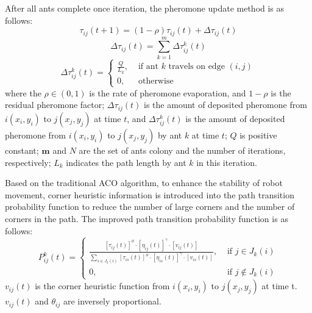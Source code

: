 \documentclass{iosart2c}
\begin{document}
After all ants complete once iteration, the pheromone update method is as follows:
\begin{equation} %
\tau_{i j}(t+1)=(1-\rho) \tau_{i j}(t)+\Delta \tau_{i j}(t)
\label{eq5}
\end{equation}
\begin{equation} %
\Delta \tau_{i j}(t)=\sum_{k=1}^{m} \Delta \tau_{i j}^{k}(t)
\end{equation}
\begin{equation} %
\Delta \tau_{i j}^{k}(t)=\left\{\begin{array}{ll}{\frac{Q}{L_{k}},} & {\text { if ant } k \text { travels on edge }(i, j)} \\ {0,} & {\text { otherwise }}\end{array}\right.
\end{equation}
where the $\rho \in(0,1)$ is the rate of pheromone evaporation, and $1-\rho$ is the residual
pheromone factor; $\Delta \tau_{i j}(t)$ is the amount of deposited pheromone from $i\left(x_{i}, y_{i}\right)$ to $j\left(x_{j}, y_{j}\right)$ at time $t$, and $\Delta \tau_{i j}^{k}(t)$ is the amount of deposited pheromone from $i\left(x_{i}, y_{i}\right)$ to $j\left(x_{j}, y_{j}\right)$ by ant $k$ at time $t$; $Q$ is positive constant; $\mathbf{m}$ and $N$ are the set of ants colony and the number of iterations, respectively; $L_{k}$ indicates the path length by ant $k$ in this iteration.

Based on the traditional ACO algorithm, to enhance the stability of robot movement, corner heuristic information is introduced into the path transition probability function to reduce the number of large corners and the number of corners in the path. The improved path transition probability function is as follows:
\begin{equation} %
\!P_{i j}^{k}(t)\!\!=\left\{\!\begin{array}{ll}
\frac{\!\left[\tau_{i j}(t)\right]^{\phi}\! \cdot \!\left[\eta_{i j}(t)\right]^{\gamma}\! \cdot \!\left[v_{i j}(t)\right]\!}{\sum\limits_{s \in \!J_{k}(i)\!} \!\left[\tau_{i s}(t)\right]^{\phi}\! \cdot \!\left[\eta_{i s}(t)\right]^{\gamma}\! \cdot \!\left[v_{i s}(t)\right]\!}, & \!\text { if }\! \!j\! \!\in\! \!J_{k}(i)\! \\
0, & \!\text { if }\! \!j\! \!\notin J_{k}(i)\!
\end{array}\right.
\end{equation}
$v_{i j}(t)$ is the corner heuristic function from $i\left(x_{i}, y_{i}\right)$ to $j\left(x_{j}, y_{j}\right)$ at time t. $v_{i j}(t)$ and
$\theta_{i j}$ are inversely proportional.
\end{document}
